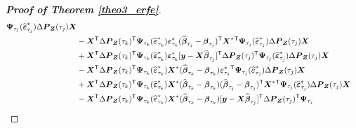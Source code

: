 \documentclass[15pt,a4paper]{article}
\newcommand{\transpose}{{}^{\text{\sffamily T}}}
\begin{document}
\begin{proof}[\textbf{Proof of Theorem \ref{theo3_erfe}}]
\begin{equation*}
\begin{split}
        \boldsymbol{\Psi}_{\tau_j}(\widehat{\boldsymbol{\varepsilon}}^{*}_{\tau_j})\Delta\boldsymbol{P}_{\boldsymbol{Z}}(\tau_j)\boldsymbol{X}\\
& - \boldsymbol{X}\transpose\Delta\boldsymbol{P}_{\boldsymbol{Z}}(\tau_k)\transpose\boldsymbol{\Psi}_{\tau_k}(\widehat{\boldsymbol{\varepsilon}}^{*}_{\tau_k})\boldsymbol{\varepsilon}^{*}_{\tau_{k}}(\widehat{\boldsymbol{\beta}}_{\tau_{j}} -   
        \boldsymbol{\beta}_{\tau_{j}})\transpose\boldsymbol{X}^{*}\transpose\boldsymbol{\Psi}_{\tau_j}(\widehat{\boldsymbol{\varepsilon}}^{*}_{\tau_j})\Delta\boldsymbol{P}_{\boldsymbol{Z}}(\tau_j)\boldsymbol{X}\\
& + \boldsymbol{X}\transpose\Delta\boldsymbol{P}_{\boldsymbol{Z}}(\tau_k)\transpose\boldsymbol{\Psi}_{\tau_k}(\widehat{\boldsymbol{\varepsilon}}^{*}_{\tau_k})\boldsymbol{\varepsilon}^{*}_{\tau_{k}}[\boldsymbol{y}-\boldsymbol{X}
        \widehat{\boldsymbol{\beta}}_{\tau_{j}}]\transpose\Delta\boldsymbol{P}_{\boldsymbol{Z}}(\tau_{j})\transpose\boldsymbol{\Psi}_{\tau_j}(\widehat{\boldsymbol{\varepsilon}}^{*}_{\tau_j})
        \Delta\boldsymbol{P}_{\boldsymbol{Z}}(\tau_j)\boldsymbol{X}\\
& - \boldsymbol{X}\transpose\Delta\boldsymbol{P}_{\boldsymbol{Z}}(\tau_k)\transpose\boldsymbol{\Psi}_{\tau_k}(\widehat{\boldsymbol{\varepsilon}}^{*}_{\tau_k})\boldsymbol{X}^{*} (\widehat{\boldsymbol{\beta}}_{\tau_{k}} -   
        \boldsymbol{\beta}_{\tau_{k}})\boldsymbol{\varepsilon}^{*}_{\tau_{j}}\transpose\boldsymbol{\Psi}_{\tau_j}(\widehat{\boldsymbol{\varepsilon}}^{*}_{\tau_j})\Delta\boldsymbol{P}_{\boldsymbol{Z}}(\tau_j)\boldsymbol{X}\\
& + \boldsymbol{X}\transpose\Delta\boldsymbol{P}_{\boldsymbol{Z}}(\tau_k)\transpose\boldsymbol{\Psi}_{\tau_k}(\widehat{\boldsymbol{\varepsilon}}^{*}_{\tau_k})\boldsymbol{X}^{*} (\widehat{\boldsymbol{\beta}}_{\tau_{k}} -   
    \boldsymbol{\beta}_{\tau_{k}})(\widehat{\boldsymbol{\beta}}_{\tau_{j}} - \boldsymbol{\beta}_{\tau_{j}})\transpose\boldsymbol{X}^{*}\transpose\boldsymbol{\Psi}_{\tau_j}(\widehat{\boldsymbol{\varepsilon}}^{*}_{\tau_j})\Delta\boldsymbol{P}_{\boldsymbol{Z}}(\tau_j)\boldsymbol{X}\\
& - \boldsymbol{X}\transpose\Delta\boldsymbol{P}_{\boldsymbol{Z}}(\tau_k)\transpose\boldsymbol{\Psi}_{\tau_k}(\widehat{\boldsymbol{\varepsilon}}^{*}_{\tau_k})\boldsymbol{X}^{*} (\widehat{\boldsymbol{\beta}}_{\tau_{k}} -
        \boldsymbol{\beta}_{\tau_{k}})[\boldsymbol{y}-\boldsymbol{X}\widehat{\boldsymbol{\beta}}_{\tau_{j}}]\transpose\Delta\boldsymbol{P}_{\boldsymbol{Z}}(\tau_{j})\transpose\boldsymbol{\Psi}_{\tau_j}

\end{split}
\end{equation*}
\end{proof}
\end{document}
